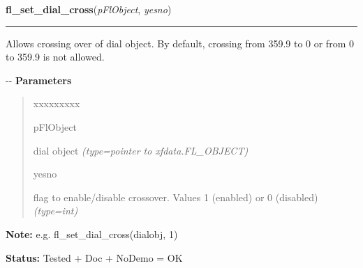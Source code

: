 \hspace{.8\funcindent}\begin{boxedminipage}{\funcwidth}

    \raggedright \textbf{fl\_set\_dial\_cross}(\textit{pFlObject}, \textit{yesno})

    \vspace{-1.5ex}

    \rule{\textwidth}{0.5\fboxrule}
\setlength{\parskip}{2ex}

Allows crossing over of dial object. By default, crossing from
359.9 to 0 or from 0 to 359.9 is not allowed.

-{}-
\setlength{\parskip}{1ex}
      \textbf{Parameters}
      \vspace{-1ex}

      \begin{quote}
        \begin{Ventry}{xxxxxxxxx}

          \item[pFlObject]


dial object
            {\it (type=pointer to xfdata.FL\_OBJECT)}

          \item[yesno]


flag to enable/disable crossover. Values 1 (enabled) or 0 (disabled)
            {\it (type=int)}

        \end{Ventry}

      \end{quote}

\textbf{Note:} 
e.g. fl\_set\_dial\_cross(dialobj, 1)


\textbf{Status:} 
Tested + Doc + NoDemo = OK


    \end{boxedminipage}

    \label{xformslib:fldial:fl_set_dial_cross}

    \vspace{0.5ex}

